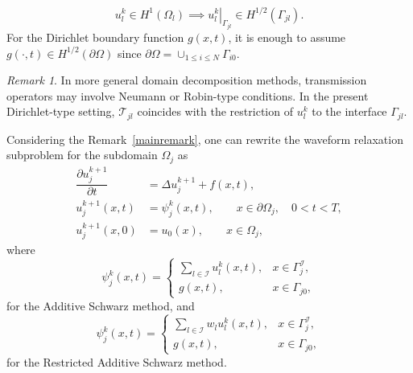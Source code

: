 \documentclass[a4paper, 11pt]{article}
\theoremstyle{remark}
\newtheorem{remark}[equation]{Remark}
\begin{document}
\begin{equation*}
    u_l^k \in H^1(\Omega_l) \implies \left.u_l^k\right|_{\Gamma_{jl}} \in H^{1/2}(\Gamma_{jl}).
\end{equation*}
For the Dirichlet boundary function $g(x, t)$, it is enough to assume $g(\cdot, t)\in H^{1/2}(\partial\Omega)$ since $\partial\Omega = \cup_{1\leq i\leq N}\Gamma_{i0}$.
\begin{remark}
   In more general domain decomposition methods, transmission operators may involve Neumann or Robin-type conditions. In the present Dirichlet-type setting, $\mathcal{T}_{jl}$ coincides with the restriction of $u_l^k$ to the interface $\Gamma_{jl}$. 
\end{remark}
\noindent Considering the Remark~\ref{mainremark}, one can rewrite the waveform relaxation subproblem for the subdomain $\Omega_{j}$ as
\begin{align*}
    \dfrac{\partial u_{j}^{k+1}}{\partial t} &= \Delta u_{j}^{k+1} + f(x, t),\\
    u_{j}^{k+1}(x, t) &= \psi_{j}^{k}(x, t), \qquad x\in \partial\Omega_{j}, \quad 0<t<T,\\
    u_{j}^{k+1}(x, 0) &= u_{0}(x), \qquad x\in \Omega_{j},
\end{align*}
where
\begin{equation*}
    \psi_{j}^{k}(x, t) = 
    \begin{cases}
        \sum_{l\in\mathcal{I}}u_{l}^{k}(x, t), & x\in \Gamma_{j}^{\mathcal{I}},\\
        g(x, t), & x\in \Gamma_{j0},
    \end{cases}
\end{equation*}
for the Additive Schwarz method, and
\begin{equation*}
    \psi_{j}^{k}(x, t) = 
    \begin{cases}
        \sum_{l\in\mathcal{I}}w_{l}u_{l}^{k}(x, t), & x\in \Gamma_{j}^{\mathcal{I}},\\
        g(x, t), & x\in \Gamma_{j0},
    \end{cases}
\end{equation*}
for the Restricted Additive Schwarz method. 
\end{document}
